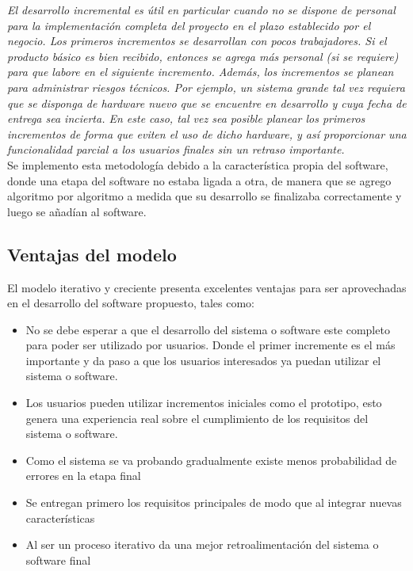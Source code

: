 \textit{El desarrollo incremental es útil en particular cuando no se dispone de personal para la implementación completa del proyecto en el plazo establecido por el negocio. Los primeros incrementos se desarrollan con pocos trabajadores. Si el producto básico es bien recibido, entonces se agrega más personal (si se requiere) para que labore en el siguiente incremento. Además, los incrementos se planean para administrar riesgos técnicos. Por ejemplo, un sistema grande tal vez requiera que se disponga de hardware nuevo que se encuentre en desarrollo y cuya fecha de entrega sea incierta. En este caso, tal vez sea posible planear los primeros incrementos de forma que eviten el uso de dicho hardware, y así proporcionar una funcionalidad parcial a los usuarios finales sin un retraso importante.} \cite[pág. 36]{pressman1988ingenieria}\\

Se implemento esta metodología debido a la característica propia del software, donde una etapa del software no estaba ligada a otra, de manera que se agrego algoritmo por algoritmo a medida que su desarrollo se finalizaba correctamente y luego se añadían al software.


\subsection*{Ventajas del modelo}
El modelo iterativo y creciente presenta excelentes ventajas para ser aprovechadas en el desarrollo del software propuesto, tales como:
\begin{itemize}
\item No se debe esperar a que el desarrollo del sistema o software este completo para poder ser utilizado por usuarios. Donde el primer incremente es el más importante y da paso a que los usuarios interesados ya puedan utilizar el sistema o software.
\item Los usuarios pueden utilizar incrementos iniciales como el prototipo, esto genera una experiencia real sobre el cumplimiento de los requisitos del sistema o software.
\item Como el sistema se va probando gradualmente existe menos probabilidad de errores en la etapa final
\item Se entregan primero los requisitos principales de modo que al integrar nuevas características
\item Al ser un proceso iterativo da una mejor retroalimentación del sistema o software final   
\end{itemize}


